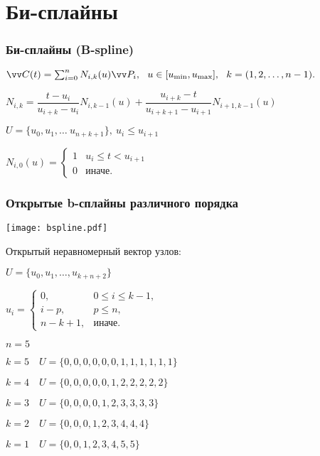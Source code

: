 \documentclass[10pt]{beamer}
\begin{document}
\section{Би-сплайны}
\frame{\sectionpage}


\begin{frame}\frametitle{Би-сплайны (B-spline)}
	
	$
	\vv C(t) = \sum_{i=0}^{n}N_{i,k}(u)\vv P_i, \ \ u\in [u_\text{min}, u_\text{max}], \ \ k=(1,2,\dots{},n-1).
	$
	
	\vspace{1ex}
	$N_{i,k}=\dfrac{t-u_i}{u_{i+k}-u_i}N_{i,k-1}(u)+
	         \dfrac{u_{i+k}-t}{u_{i+k+1}-u_{i+1}}N_{i+1,k-1}(u)$
	
	\vspace{1ex}
	$U=\{u_0, u_1, \dots  \ u_{n+k+1} \}, \ u_i \leq u_{i+1} $
	
	\vspace{1ex}
	$N_{i,0}(u)=
	\begin{cases}
		1 & u_i\leq t < u_{i+1} \\
		0 & \text{иначе}.
	\end{cases}
	$
	
	
	
	
\end{frame}

 
 \begin{frame}\frametitle{Открытые b-сплайны различного порядка}
 	
 	{
 		\texttt{[image: bspline.pdf]}
 	}{
 		
 		Открытый неравномерный вектор узлов:
 		
 		$U=\{u_0, u_1, \ldots, u_{k+n+2}\}$
 		
 				
 		$u_i=
 		\begin{cases}
 			0, & 0 \leq i \leq k-1,\\
 			i-p, & p \leq n,\\
 			n-k+1, & \text{иначе}.
 		\end{cases}$
 		
 		 		

		\vspace{1ex}
 		$n=5$
 		
 		{\color{DarkGoldenrod}$k=5 \quad U = \{ 0,0,0,0,0,0,1,1,1,1,1,1\}$}
 		
 		{\color{Magenta}$k=4 \quad U = \{ 0,0,0,0,0,1,2,2,2,2,2\}$}
 		
 		{\color{Blue}$k=3 \quad U = \{ 0,0,0,0,1,2,3,3,3,3\}$}
 		
 		{\color{ForestGreen}$k=2 \quad U = \{ 0,0,0,1,2,3,4,4,4\}$}
 		
 		{\color{red}$k=1 \quad U = \{ 0,0,1,2,3,4,5,5\}$}
 		
 		
 	}
 	
 \end{frame}
 
\end{document}
